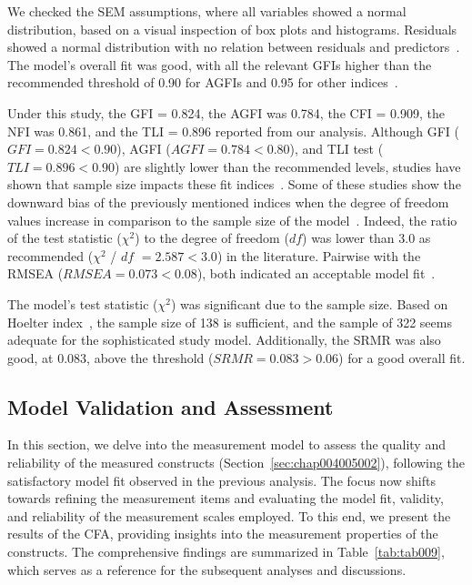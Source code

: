 We checked the \ac{SEM} assumptions, where all variables showed a normal distribution, based on a visual inspection of box plots and histograms.
Residuals showed a normal distribution with no relation between residuals and predictors~\cite{CALISTO2022102922}.
The model's overall fit was good, with all the relevant \acp{GFI} higher than the recommended threshold of 0.90 for \acp{AGFI} and 0.95 for other indices~\cite{doi:10.1504/IJMDA.2017.087624, SUMAK2016602}.

Under this study, the \ac{GFI} = 0.824, the \ac{AGFI} was 0.784, the \ac{CFI} = 0.909, the \ac{NFI} was 0.861, and the \ac{TLI} = 0.896 reported from our analysis.
Although \ac{GFI} ($GFI = 0.824 < 0.90$), \ac{AGFI} ($AGFI = 0.784 < 0.80$), and \ac{TLI} test ($TLI = 0.896 < 0.90$) are slightly lower than the recommended levels, studies have shown that sample size impacts these fit indices~\cite{KHALILZADEH2017460, doi:10.1080/00273171.2019.1602503, ZHOU2010760}.
Some of these studies show the downward bias of the previously mentioned indices when the degree of freedom values increase in comparison to the sample size of the model~\cite{doi:10.1080/00273171.2019.1602503}.
Indeed, the ratio of the test statistic ($\chi^2$) to the degree of freedom ($df$) was lower than 3.0 as recommended ($\chi^2$ / $df$ $= 2.587 < 3.0$) in the literature.
Pairwise with the \ac{RMSEA} ($RMSEA = 0.073 < 0.08$), both indicated an acceptable model fit~\cite{ZHOU2010760}.

The model's test statistic ($\chi^2$) was significant due to the sample size.
Based on Hoelter index~\cite{CALISTO2022102922}, the sample size of 138 is sufficient, and the sample of 322 seems adequate for the sophisticated study model.
Additionally, the \ac{SRMR} was also good, at 0.083, above the threshold ($SRMR = 0.083 > 0.06$) for a good overall fit.

\subsection{Model Validation and Assessment}
\label{chap:app002004002}

In this section, we delve into the measurement model to assess the quality and reliability of the measured constructs (Section~\ref{sec:chap004005002}), following the satisfactory model fit observed in the previous analysis.
The focus now shifts towards refining the measurement items and evaluating the model fit, validity, and reliability of the measurement scales employed.
To this end, we present the results of the \ac{CFA}, providing insights into the measurement properties of the constructs.
The comprehensive findings are summarized in Table~\ref{tab:tab009}, which serves as a reference for the subsequent analyses and discussions.


